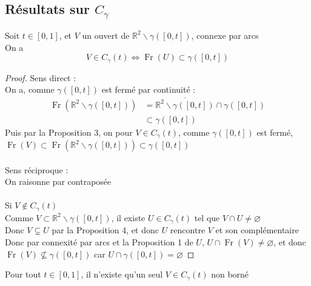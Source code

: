 \documentclass{article}
\begin{document}
\begin{flushleft}
\subsection{Résultats sur $C_{\gamma}$}

\begin{tcolorbox}[colback=purple!20!white, colframe=purple!60!white, title = Proposition 10]
    Soit $t \in [0, 1]$, et $V$ un ouvert de $\mathbb{R}^2 \backslash \gamma([0, t])$, connexe par arcs\\
    On a
    \[V \in C_{\gamma}(t) \Longleftrightarrow \operatorname{Fr}(U) \subset \gamma([0, t])\]
\end{tcolorbox}

\begin{proof}
Sens direct :\\
On a, comme $\gamma([0, t])$ est fermé par continuité :
\begin{align*}
    \operatorname{Fr}(\mathbb{R}^2 \backslash \gamma([0, t])) &= \overline{\mathbb{R}^2 \backslash \gamma([0, t])} \cap \gamma([0, t])\\
    &\subset \gamma([0, t])
\end{align*}
Puis par la Proposition 3, on pour $V \in C_{\gamma}(t)$, comme $\gamma([0, t])$ est fermé,
$\operatorname{Fr}(V) \subset \operatorname{Fr}(\mathbb{R}^2 \backslash \gamma([0, t])) \subset \gamma([0, t])$
\\~\\
Sens réciproque :\\
On raisonne par contraposée
\\~\\
Si $V \notin C_{\gamma}(t)$\\
Comme $V \subset \mathbb{R}^2 \backslash \gamma([0, t])$, il existe $U \in C_{\gamma}(t)$
tel que $V \cap U \neq \varnothing$\\
Donc $V \subsetneq U$ par la Proposition 4, et donc $U$ rencontre $V$ et son complémentaire\\
Donc par connexité par arcs et la Proposition 1 de $U$, $U \cap \operatorname{Fr}(V) \neq \varnothing$, et donc
$\operatorname{Fr}(V) \nsubseteq \gamma([0, t])$ car $U \cap \gamma([0, t]) = \varnothing$

\end{proof}

\begin{tcolorbox}[colback = purple!20!white, colframe = purple!60!white, title = Proposition 11]
    Pour tout $t \in [0, 1]$, il n'existe qu'un seul $V \in C_{\gamma}(t)$ non borné
\end{tcolorbox}


\end{flushleft}
\end{document}
